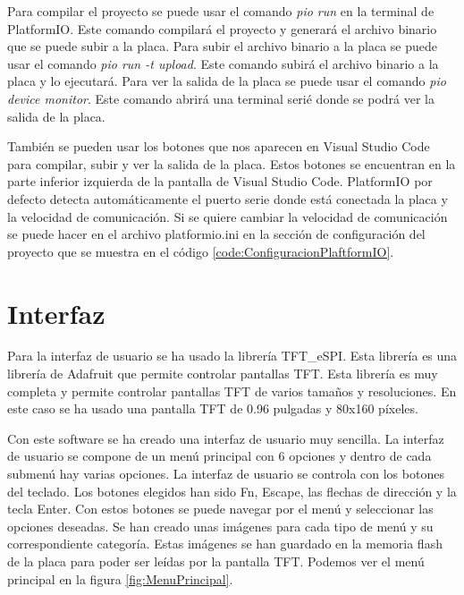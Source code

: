 Para compilar el proyecto se puede usar el comando \textit{pio run} en la terminal de PlatformIO. Este comando compilará el proyecto y generará el archivo binario que se puede subir a la placa. Para subir el archivo binario a la placa se puede usar el comando \textit{pio run -t upload}. Este comando subirá el archivo binario a la placa y lo ejecutará. Para ver la salida de la placa se puede usar el comando \textit{pio device monitor}. Este comando abrirá una terminal serié donde se podrá ver la salida de la placa.

También se pueden usar los botones que nos aparecen en Visual Studio Code para compilar, subir y ver la salida de la placa. Estos botones se encuentran en la parte inferior izquierda de la pantalla de Visual Studio Code. PlatformIO por defecto detecta automáticamente el puerto serie donde está conectada la placa y la velocidad de comunicación. Si se quiere cambiar la velocidad de comunicación se puede hacer en el archivo platformio.ini en la sección de configuración del proyecto que se muestra en el código \ref{code:ConfiguracionPlaftformIO}.

\section{Interfaz}

Para la interfaz de usuario se ha usado la librería TFT\_eSPI. Esta librería es una librería de Adafruit que permite controlar pantallas TFT. Esta librería es muy completa y permite controlar pantallas TFT de varios tamaños y resoluciones. En este caso se ha usado una pantalla TFT de 0.96 pulgadas y 80x160 píxeles.

Con este software se ha creado una interfaz de usuario muy sencilla. La interfaz de usuario se compone de un menú principal con 6 opciones y dentro de cada submenú hay varias opciones. La interfaz de usuario se controla con los botones del teclado. Los botones elegidos han sido Fn, Escape, las flechas de dirección y la tecla Enter. Con estos botones se puede navegar por el menú y seleccionar las opciones deseadas. Se han creado unas imágenes para cada tipo de menú y su correspondiente categoría. Estas imágenes se han guardado en la memoria flash de la placa para poder ser leídas por la pantalla TFT. Podemos ver el menú principal en la figura \ref{fig:MenuPrincipal}.

